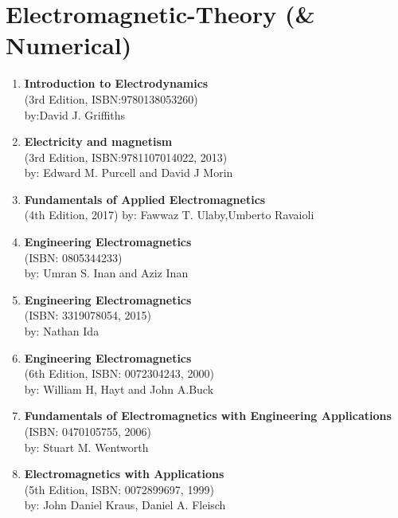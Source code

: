 \documentclass{article}
\begin{document}
\newpage
\section{Electromagnetic-Theory (\& Numerical)}
%
\begin{enumerate}
\item \textbf{Introduction to Electrodynamics}\\
(3rd Edition, ISBN:9780138053260)\\
by:David J. Griffiths
%
\item \textbf{Electricity and magnetism}\\
(3rd Edition, ISBN:9781107014022, 2013)\\
by: Edward M. Purcell and David J Morin
%
\item \textbf{Fundamentals of Applied Electromagnetics}\\
(4th Edition, 2017)
by: Fawwaz T. Ulaby,Umberto Ravaioli
%
\item \textbf{Engineering Electromagnetics}\\
(ISBN: 0805344233)\\
by: Umran S. Inan and Aziz Inan
%
\item \textbf{Engineering Electromagnetics}\\
(ISBN: 3319078054, 2015)\\
by: Nathan Ida
%
\item \textbf{Engineering Electromagnetics}\\
(6th Edition, ISBN: 0072304243, 2000)\\
by: William H, Hayt and John A.Buck
%
\item \textbf{Fundamentals of Electromagnetics with Engineering Applications}\\
(ISBN: 0470105755, 2006)\\
by: Stuart M. Wentworth
%
\item \textbf{Electromagnetics with Applications}\\
(5th Edition, ISBN: 0072899697, 1999)\\
by: John Daniel Kraus, Daniel A. Fleisch
\end{enumerate}


\newpage
\end{document}

